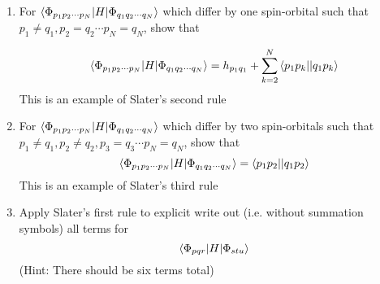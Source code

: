 \documentclass{article}
\newcommand{\cd}{\ensuremath{\cdots} }
\begin{document}
\begin{enumerate}
 \item For $\braket{\Phi_{p_1 p_2 \cd p_N} | H | \Phi_{q_1 q_2 \cd q_N} }$ which differ by one spin-orbital such that $p_1 \neq q_1, p_2 = q_2 \cd p_N = q_N$, show that 
 
 \[\braket{\Phi_{p_1 p_2 \cd p_N} | H | \Phi_{q_1 q_2 \cd q_N} } = h_{p_1 q_1}  + \sum_{k=2}^N \braket{p_1 p_k || q_1 p_k}  \]
 This is an example of Slater's second rule
 
 \item For $\braket{\Phi_{p_1 p_2 \cd p_N} | H | \Phi_{q_1 q_2 \cd q_N} }$ which differ by two spin-orbitals such that $p_1 \neq q_1, p_2 \neq q_2, p_3 = q_3 \cd p_N = q_N$, show that
\[\braket{\Phi_{p_1 p_2 \cd p_N} | H | \Phi_{q_1 q_2 \cd q_N} } =  \braket{p_1 p_2 || q_1 p_2}  \]
   This is an example of Slater's third rule
 \item Apply Slater's first rule to explicit write out (i.e. without summation symbols) all terms for  \[\braket{\Phi_{pqr} | H| \Phi_{stu}} \]
 (Hint: There should be six terms total)
 
\end{enumerate}
\end{document}
